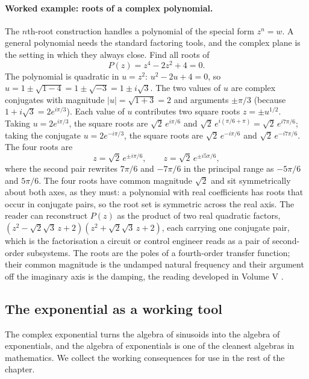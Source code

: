 \paragraph{Worked example: roots of a complex polynomial.} The
$n$th-root construction handles a polynomial of the special form
$z^{n} = w$. A general polynomial needs the standard factoring tools,
and the complex plane is the setting in which they always close. Find
all roots of
\[
P(z) = z^{4} - 2z^{2} + 4 = 0.
\]
The polynomial is quadratic in $u = z^{2}$: $u^{2} - 2u + 4 = 0$, so
$u = 1 \pm \sqrt{1 - 4} = 1 \pm \sqrt{-3} = 1 \pm i\sqrt{3}$. The two
values of $u$ are complex conjugates with magnitude $|u| = \sqrt{1 + 3}
= 2$ and arguments $\pm\pi/3$ (because $1 + i\sqrt 3 = 2e^{i\pi/3}$).
Each value of $u$ contributes two square roots $z = \pm u^{1/2}$. Taking
$u = 2e^{i\pi/3}$, the square roots are $\sqrt{2}\,e^{i\pi/6}$ and
$\sqrt{2}\,e^{i(\pi/6 + \pi)} = \sqrt{2}\,e^{i 7\pi/6}$; taking the
conjugate $u = 2e^{-i\pi/3}$, the square roots are
$\sqrt{2}\,e^{-i\pi/6}$ and $\sqrt{2}\,e^{-i 7\pi/6}$. The four roots
are
\[
z = \sqrt{2}\,e^{\pm i\pi/6}, \qquad z = \sqrt{2}\,e^{\pm i 5\pi/6},
\]
where the second pair rewrites $7\pi/6$ and $-7\pi/6$ in the principal
range as $-5\pi/6$ and $5\pi/6$. The four roots have common magnitude
$\sqrt{2}$ and sit symmetrically about both axes, as they must: a
polynomial with real coefficients has roots that occur in conjugate
pairs, so the root set is symmetric across the real axis. The reader
can reconstruct $P(z)$ as the product of two real quadratic factors,
$(z^{2} - \sqrt{2}\sqrt{3}\,z + 2)(z^{2} + \sqrt{2}\sqrt{3}\,z + 2)$,
each carrying one conjugate pair, which is the factorisation a circuit
or control engineer reads as a pair of second-order subsystems. The
roots are the poles of a fourth-order transfer function; their
common magnitude is the undamped natural frequency and their argument
off the imaginary axis is the damping, the reading developed in
Volume V \cite[chapter 1]{text:v2ch03-stein-shakarchi-complex}.

\subsection{The exponential as a working tool}

The complex exponential turns the algebra of sinusoids into the
algebra of exponentials, and the algebra of exponentials is one
of the cleanest algebras in mathematics. We collect the working
consequences for use in the rest of the chapter.

